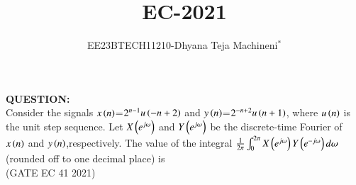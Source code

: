 \documentclass[journal,12pt,twocolumn]{IEEEtran}
\theoremstyle{remark}
\begin{document}

\vspace{3cm}
\title{\textbf{EC-2021}}
\author{EE23BTECH11210-Dhyana Teja Machineni$^{*}$%
}
\maketitle
\newpage
\bigskip

\textbf{QUESTION:}\\
Consider the signals $x\left(n\right)$=$2^{n-1} u\left( -n+2\right)$ and $y\left(n\right)$=$2^{-n+2}u\left( n+1\right)$, where $u\left(n\right)$ is the unit step sequence. Let $X\left(e^{j\omega}\right)$ and $Y\left(e^{j\omega}\right)$ be the discrete-time Fourier of $x\left(n\right)$ and $y\left(n\right)$,respectively. The value of the integral $\frac{1}{2\pi}\int_{0}^{2\pi} X\left(e^{j\omega}\right) Y\left(e^{-j\omega}\right) d \omega$
(rounded off to one decimal place) is \underline{{\hspace{1.5in}}}\\
\hfill{(GATE EC 41 2021)}\\

\solution\\
\fi
\end{document}
